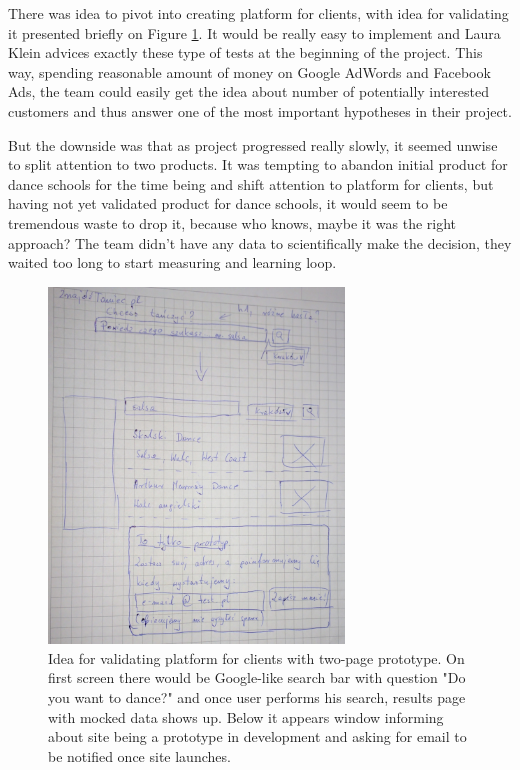 \documentclass{article}
\begin{document}
There was idea to pivot into creating platform for clients, with idea for validating it presented briefly on Figure \ref{fig:znajdz-taniec}. It would be really easy to implement and Laura Klein \citep{klein2013ux} advices exactly these type of tests at the beginning of the project. This way, spending reasonable amount of money on Google AdWords and Facebook Ads, the team could easily get the idea about number of potentially interested customers and thus answer one of the most important hypotheses in their project.

But the downside was that as project progressed really slowly, it seemed unwise to split attention to two products. It was tempting to abandon initial product for dance schools for the time being and shift attention to platform for clients, but having not yet validated product for dance schools, it would seem to be tremendous waste to drop it, because who knows, maybe it was the right approach? The team didn't have any data to scientifically make the decision, they waited too long to start measuring and learning loop.

\begin{figure}[h]
    \centering
    \includegraphics[width=0.7\textwidth]{znajdz-taniec}
    \caption{Idea for validating platform for clients with two-page prototype. On first screen there would be Google-like search bar with question "Do you want to dance?" and once user performs his search, results page with mocked data shows up. Below it appears window informing about site being a prototype in development and asking for email to be notified once site launches.}
    \label{fig:znajdz-taniec} 
\end{figure}
\end{document}
